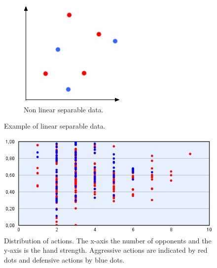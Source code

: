 \begin{centering}
\begin{figure}
\begin{subfigure}[b]{0.4\textwidth}
    \includegraphics[width=\textwidth]{images/nn/non-separable.png}
    \caption{Non linear separable data.}
    \label{fig:2}
  \end{subfigure}
  \caption{Example of linear separable data.}
\end{figure}
\end{centering}

\begin{figure}[H]
  \center
    \includegraphics[scale=0.8]{images/nn/default-nn1-plot.png}
  \caption{Distribution of actions. The x-axis  the number of opponents and the y-axis is the hand strength. Aggressive actions are indicated by red dots and defensive actions by blue dots. \label{fig:linear-separable}}
\end{figure}

